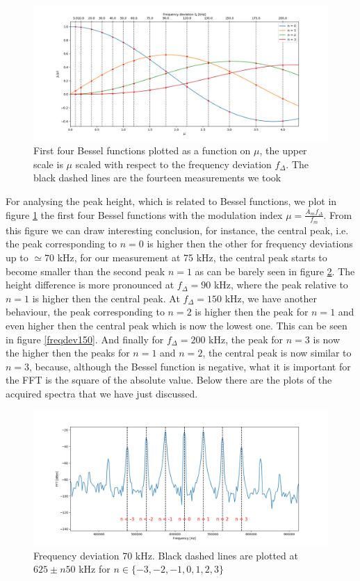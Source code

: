 \documentclass[a4paper,10pt]{article}
\begin{document}
\begin{figure}[H]
\hspace{-4.5em}\includegraphics[width=1.2\textwidth]{bessel}
\caption{First four Bessel functions plotted as a function on $\mu$, the upper scale is $\mu$ scaled with respect to the frequency deviation $f_\Delta$. The black dashed lines are the fourteen measurements we took}\label{bessel}
\end{figure}
For analysing the peak height, which is related to Bessel functions, we plot in figure \ref{bessel} the first four Bessel functions with the modulation index  $\mu = \displaystyle\frac{A_m f_\Delta }{f_m }$. From this figure we can draw interesting conclusion, for instance, the central peak, i.e. the peak corresponding to $n=0$ is higher then the other for frequency deviations up to $\simeq 70$ kHz, for our measurement at 75 kHz, the central peak starts to become smaller than the second peak $n=1$ as can be barely seen in figure \ref{freqdev75}. The height difference is more pronounced at $f_\Delta = 90$ kHz, where the peak relative to $n=1$ is higher then the central peak. At $f_\Delta = 150$ kHz, we have another behaviour, the peak corresponding to $n=2$ is higher then the peak for $n=1$ and even higher then the central peak which is now the lowest one. This can be seen in figure  \ref{freqdev150}. And finally for $f_\Delta = 200$ kHz, the peak for $n=3$ is now the higher then the peaks for $n=1$ and $n=2$, the central peak is now similar to $n=3$, because, although the Bessel function is negative, what it is important for the FFT is the square of the absolute value. Below there are the plots of the acquired spectra that we have just discussed.
\begin{figure}[H]
\centering
\includegraphics[width=\textwidth]{freqdev75}
\caption{Frequency deviation 70 kHz. Black dashed lines are plotted at $625\pm n50$ kHz for $n\in\{-3,-2,-1,0,1,2,3\}$}\label{freqdev75}
\end{figure}
\end{document}
